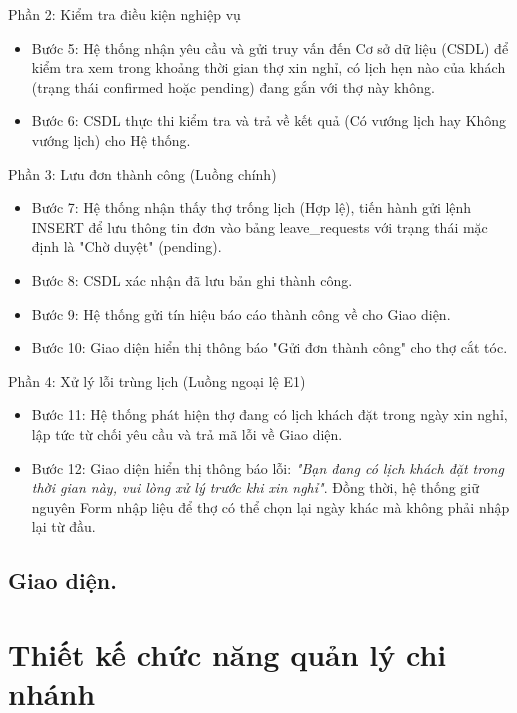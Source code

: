 \documentclass[../BTL.tex]{subfiles}
\begin{document}
Phần 2: Kiểm tra điều kiện nghiệp vụ

\begin{itemize}
\item
  Bước 5: Hệ thống nhận yêu cầu và gửi truy vấn đến Cơ sở dữ liệu (CSDL)
  để kiểm tra xem trong khoảng thời gian thợ xin nghỉ, có lịch hẹn nào
  của khách (trạng thái confirmed hoặc pending) đang gắn với thợ này
  không.
\item
  Bước 6: CSDL thực thi kiểm tra và trả về kết quả (Có vướng lịch hay
  Không vướng lịch) cho Hệ thống.
\end{itemize}

Phần 3: Lưu đơn thành công (Luồng chính)

\begin{itemize}
\item
  Bước 7: Hệ thống nhận thấy thợ trống lịch (Hợp lệ), tiến hành gửi lệnh
  INSERT để lưu thông tin đơn vào bảng leave\_requests với trạng thái
  mặc định là "Chờ duyệt" (pending).
\item
  Bước 8: CSDL xác nhận đã lưu bản ghi thành công.
\item
  Bước 9: Hệ thống gửi tín hiệu báo cáo thành công về cho Giao diện.
\item
  Bước 10: Giao diện hiển thị thông báo "Gửi đơn thành công" cho thợ cắt
  tóc.
\end{itemize}

Phần 4: Xử lý lỗi trùng lịch (Luồng ngoại lệ E1)

\begin{itemize}
\item
  Bước 11: Hệ thống phát hiện thợ đang có lịch khách đặt trong ngày xin
  nghỉ, lập tức từ chối yêu cầu và trả mã lỗi về Giao diện.
\item
  Bước 12: Giao diện hiển thị thông báo lỗi: \emph{"Bạn đang có lịch
  khách đặt trong thời gian này, vui lòng xử lý trước khi xin nghỉ"}.
  Đồng thời, hệ thống giữ nguyên Form nhập liệu để thợ có thể chọn lại
  ngày khác mà không phải nhập lại từ đầu.
\end{itemize}

\subsection{Giao diện.}


\section{Thiết kế chức năng quản lý chi nhánh}
\end{document}
